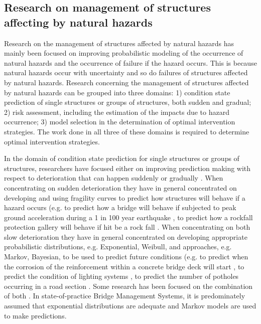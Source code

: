 \documentclass[]{article}
\begin{document}
\subsection{Research on management of structures affecting by natural hazards}

Research on the management of structures affected by natural hazards
has mainly been focused on improving probabilistic modeling of the
occurrence of natural hazards and the occurrence of failure if the hazard
occurs. This is because natural hazards occur with uncertainty and
so do failures of structures affected by natural hazards. Research
concerning the management of structures affected by natural hazards
can be grouped into three domains: 1) condition state prediction of
single structures or groups of structures, both sudden and gradual;
2) risk assessment, including the estimation of the impacts due to
hazard occurrence; 3) model selection in the determination of optimal
intervention strategies. The work done in all three of these domains
is required to determine optimal intervention strategies. 

In the domain of condition state prediction for single structures
or groups of structures, researchers have focused either on improving
prediction making with respect to deterioration that can happen suddenly
or gradually \citep{Lethanh2015}. When concentrating on sudden deterioration
they have in general concentrated on developing and using fragility
curves to predict how structures will behave if a hazard occurs (e.g.
to predict how a bridge will behave if subjected to peak ground acceleration
during a 1 in 100 year earthquake \citep{Deodatis2013,Shinozuka2000,Karim2001,Choi2004,Mackie2007,Mackie2011a},
to predict how a rockfall protection gallery will behave if hit be
a rock fall \citep{Schubert2010}. When concentrating on both slow
deterioration they have in general concentrated on developing appropriate
probabilistic distributions, e.g. Exponential, Weibull, and approaches,
e.g. Markov, Bayesian, to be used to predict future conditions (e.g.
to predict when the corrosion of the reinforcement within a concrete
bridge deck will start \citep{Kobayashi2010a,Lethanh2013a,Sobanjo2011},
to predict the condition of lighting systems \citep{Madanat1995},
to predict the number of potholes occurring in a road section \citep{Lethanh2015b}.
Some research has been focused on the combination of both \citep{Mayet2002,Lethanh2015,Fernando2015}
. In state-of-practice Bridge Management Systems, it is predominately
assumed that exponential distributions are adequate and Markov models
are used to make predictions. 
\end{document}

